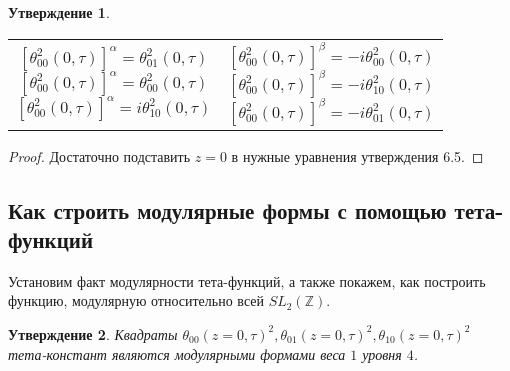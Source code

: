 \documentclass{article}
\newcommand{\ZZ}{\mathbb{Z}}
\theoremstyle{break}
\newtheorem{claim}{Утверждение}[section]
\begin{document}
\begin{claim}
	\begin{tabularx}{\textwidth}{@{}X|X@{}}
		$$[\theta_{00}^2(0, \tau)]^\alpha=\theta_{01}^2(0, \tau)$$
		$$[\theta_{00}^2(0, \tau)]^\alpha=\theta_{00}^2(0, \tau)$$
		$$[\theta_{00}^2(0, \tau)]^\alpha=i\theta_{10}^2(0, \tau)$$
		&
		$$[\theta_{00}^2(0, \tau)]^\beta=-i\theta_{00}^2(0, \tau)$$
		$$[\theta_{00}^2(0, \tau)]^\beta=-i\theta_{10}^2(0, \tau)$$
		$$[\theta_{00}^2(0, \tau)]^\beta=-i\theta_{01}^2(0, \tau)$$
	\end{tabularx}
\end{claim}
\begin{proof}
	Достаточно подставить $z=0$ в нужные уравнения утверждения 6.5.
\end{proof}

\subsection{Как строить модулярные формы с помощью тета-функций} 
Установим факт модулярности тета-функций, а также покажем, как построить функцию, модулярную относительно всей $SL_2(\ZZ)$.
\begin{claim}
	Квадраты $\theta_{00}(z=0, \tau)^2, \theta_{01}(z=0, \tau)^2, \theta_{10}(z=0, \tau)^2$ тета-констант являются модулярными формами веса $1$ уровня $4$.
\end{claim}
\end{document}
